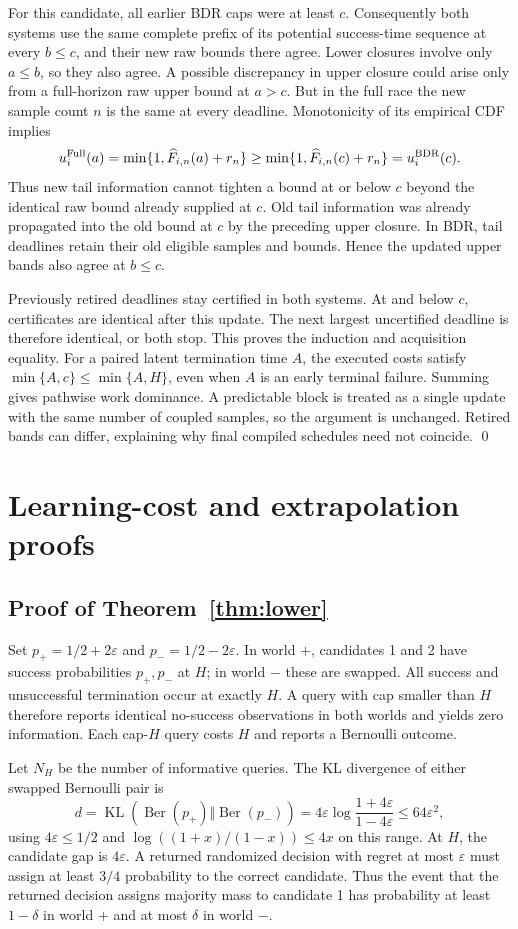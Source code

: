 \documentclass[11pt]{article}
\theoremstyle{definition}\newtheorem{definition}[theorem]{Definition}
\newcommand{\eps}{\varepsilon}
\newcommand{\KL}{\operatorname{KL}}
\begin{document}
For this candidate, all earlier BDR caps were at least $c$. Consequently both systems use the same complete prefix of its potential success-time sequence at every $b\le c$, and their new raw bounds there agree. Lower closures involve only $a\le b$, so they also agree. A possible discrepancy in upper closure could arise only from a full-horizon raw upper bound at $a>c$. But in the full race the new sample count $n$ is the same at every deadline. Monotonicity of its empirical CDF implies
\[
 u^{\rm Full}_i(a)=\min\{1,\widehat F_{i,n}(a)+r_n\}
 \ge \min\{1,\widehat F_{i,n}(c)+r_n\}=u^{\rm BDR}_i(c).
\]
Thus new tail information cannot tighten a bound at or below $c$ beyond the identical raw bound already supplied at $c$. Old tail information was already propagated into the old bound at $c$ by the preceding upper closure. In BDR, tail deadlines retain their old eligible samples and bounds. Hence the updated upper bands also agree at $b\le c$.

Previously retired deadlines stay certified in both systems. At and below $c$, certificates are identical after this update. The next largest uncertified deadline is therefore identical, or both stop. This proves the induction and acquisition equality. For a paired latent termination time $A$, the executed costs satisfy $\min\{A,c\}\le\min\{A,H\}$, even when $A$ is an early terminal failure. Summing gives pathwise work dominance. A predictable block is treated as a single update with the same number of coupled samples, so the argument is unchanged. Retired bands can differ, explaining why final compiled schedules need not coincide. \qed

\section{Learning-cost and extrapolation proofs}
\subsection{Proof of Theorem~\ref{thm:lower}}
Set $p_+=1/2+2\eps$ and $p_-=1/2-2\eps$. In world $+$, candidates 1 and 2 have success probabilities $p_+,p_-$ at $H$; in world $-$ these are swapped. All success and unsuccessful termination occur at exactly $H$. A query with cap smaller than $H$ therefore reports identical no-success observations in both worlds and yields zero information. Each cap-$H$ query costs $H$ and reports a Bernoulli outcome.

Let $N_H$ be the number of informative queries. The KL divergence of either swapped Bernoulli pair is
\[
 d=\KL(\operatorname{Ber}(p_+)\Vert\operatorname{Ber}(p_-))
 =4\eps\log\frac{1+4\eps}{1-4\eps}\le64\eps^2,
\]
using $4\eps\le1/2$ and $\log((1+x)/(1-x))\le4x$ on this range. At $H$, the candidate gap is $4\eps$. A returned randomized decision with regret at most $\eps$ must assign at least $3/4$ probability to the correct candidate. Thus the event that the returned decision assigns majority mass to candidate 1 has probability at least $1-\delta$ in world $+$ and at most $\delta$ in world $-$.
\end{document}
